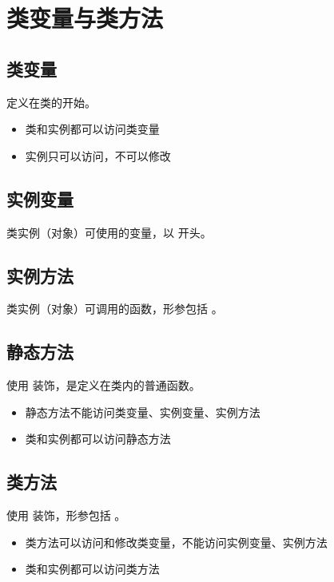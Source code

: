 \documentclass[letterpaper,10pt,english]{sphinxmanual}
\begin{document}
\section{类变量与类方法}
\label{\detokenize{python/14_classFunc::doc}}\label{\detokenize{python/14_classFunc:id1}}

\subsection{类变量}
\label{\detokenize{python/14_classFunc:id2}}
定义在类的开始。
\begin{itemize}
\item {} 
类和实例都可以访问类变量

\item {} 
实例只可以访问，不可以修改

\end{itemize}


\subsection{实例变量}
\label{\detokenize{python/14_classFunc:id3}}
类实例（对象）可使用的变量，以  开头。


\subsection{实例方法}
\label{\detokenize{python/14_classFunc:id4}}
类实例（对象）可调用的函数，形参包括  。


\subsection{静态方法}
\label{\detokenize{python/14_classFunc:id5}}
使用  装饰，是定义在类内的普通函数。
\begin{itemize}
\item {} 
静态方法不能访问类变量、实例变量、实例方法

\item {} 
类和实例都可以访问静态方法

\end{itemize}


\subsection{类方法}
\label{\detokenize{python/14_classFunc:id6}}
使用  装饰，形参包括  。
\begin{itemize}
\item {} 
类方法可以访问和修改类变量，不能访问实例变量、实例方法

\item {} 
类和实例都可以访问类方法

\end{itemize}
\end{document}
